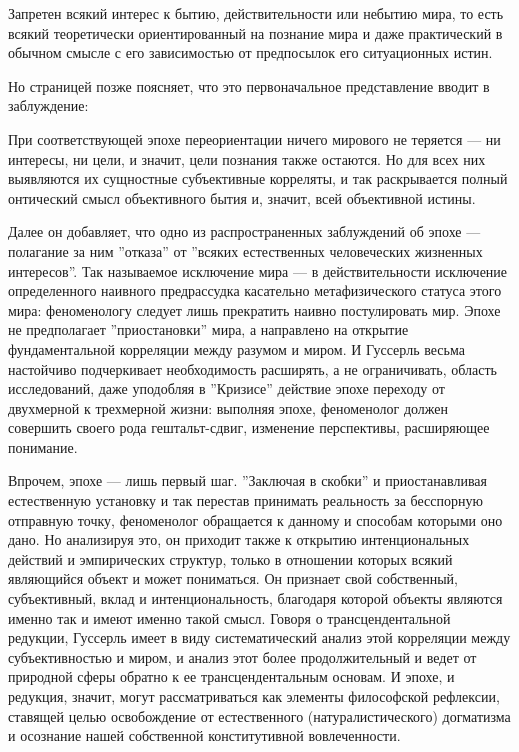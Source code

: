 \documentclass[11pt]{book}
\begin{document}
\smallskip
{}\relax
{}\relax

Запретен всякий интерес к бытию, действительности или небытию мира, то есть всякий теоретически ориентированный на познание мира и даже практический в обычном смысле с его зависимостью от предпосылок его ситуационных истин.

\relax
{}\relax
\smallskip

Но  страницей позже поясняет, что это первоначальное представление вводит в заблуждение:

\smallskip
{}\relax
{}\relax

При соответствующей эпохе переориентации ничего мирового не теряется --- ни интересы, ни цели, и значит, цели познания также остаются. Но для всех них выявляются их сущностные субъективные корреляты, и так раскрывается полный онтический смысл объективного бытия и, значит, всей объективной истины.

\relax
{}\relax
\smallskip

Далее он добавляет, что одно из распространенных заблуждений об эпохе --- полагание за ним ''отказа'' от ''всяких естественных человеческих жизненных интересов''. Так называемое исключение мира --- в действительности исключение определенного наивного предрассудка касательно метафизического статуса этого мира: феноменологу следует лишь прекратить наивно постулировать мир. Эпохе не предполагает ''приостановки'' мира, а направлено на открытие фундаментальной корреляции между разумом и миром. И Гуссерль весьма настойчиво подчеркивает необходимость расширять, а не ограничивать, область исследований, даже уподобляя в ''Кризисе'' действие эпохе переходу от двухмерной к трехмерной жизни: выполняя эпохе, феноменолог должен совершить своего рода гештальт-сдвиг, изменение перспективы, расширяющее понимание.

Впрочем, эпохе --- лишь первый шаг. ''Заключая в скобки'' и приостанавливая естественную установку и так перестав принимать реальность за бесспорную отправную точку, феноменолог обращается к данному и способам которыми оно дано. Но анализируя это, он приходит также к открытию интенциональных действий и эмпирических структур, только в отношении которых всякий являющийся объект и может пониматься. Он признает свой собственный, субъективный, вклад и интенциональность, благодаря которой объекты являются именно так и имеют именно такой смысл. Говоря о трансцендентальной редукции, Гуссерль имеет в виду систематический анализ этой корреляции между субъективностью и миром, и анализ этот более продолжительный и ведет от природной сферы обратно к ее трансцендентальным основам. И эпохе, и редукция, значит, могут рассматриваться как элементы философской рефлексии, ставящей целью освобождение от естественного (натуралистического) догматизма и осознание нашей собственной конститутивной вовлеченности.
\end{document}
